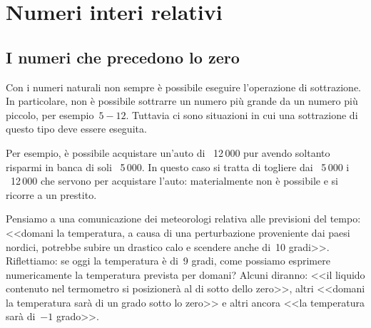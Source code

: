 


\chapter{Numeri interi relativi}


\section{I numeri che precedono lo zero}
\label{sec:int_negativi}

Con i numeri naturali non sempre è possibile eseguire l'operazione di 
sottrazione. 
In particolare, non è possibile sottrarre un numero più grande da un numero 
più piccolo, per esempio~\(5-12\). 
Tuttavia ci sono situazioni in cui una sottrazione di questo tipo deve essere 
eseguita.

Per esempio, è possibile acquistare un'auto di \officialeuro\ 12\,000 pur 
avendo soltanto risparmi in banca di soli \officialeuro\ 5\,000. 
In questo caso si tratta di togliere dai \officialeuro\ 
5\,000 i \officialeuro\ 12\,000 che servono per acquistare 
l'auto: materialmente non è possibile e si ricorre a un prestito.

Pensiamo a una comunicazione dei meteorologi relativa alle previsioni del 
tempo: <<domani la temperatura, a causa di una perturbazione proveniente dai 
paesi nordici, potrebbe subire un drastico calo e scendere anche di~10 
gradi>>. 
Riflettiamo: se oggi la temperatura è di~9 gradi, come possiamo esprimere 
numericamente la temperatura prevista per domani? 
Alcuni diranno: <<il liquido contenuto nel termometro si posizionerà al di 
sotto dello zero>>,
altri <<domani la temperatura sarà di un grado sotto lo zero>> e
altri ancora <<la temperatura sarà di~\(-1\) grado>>.


